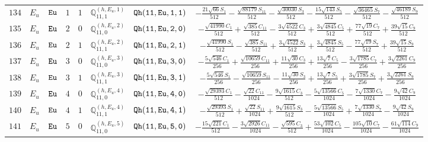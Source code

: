 \documentclass[fleqn,8pt]{jsarticle}
\begin{document}
\begin{table}[ht!]
\begin{center}
\begin{tabular}{cccccccc}
$ 134 $ & $ E_{u} $ & $ {\tt Eu} $ & $ 1 $ & $ 1 $ & $ \mathbb{Q}_{11,1}^{(h,E_{u},1)} $ & $ {\tt Qh(11,Eu,1,1)} $ & $ - \frac{21 \sqrt{66} S_{1}}{512} - \frac{\sqrt{88179} S_{11}}{512} - \frac{\sqrt{30030} S_{3}}{512} - \frac{15 \sqrt{143} S_{5}}{512} - \frac{\sqrt{36465} S_{7}}{512} - \frac{\sqrt{46189} S_{9}}{512} $ \\
$ 135 $ & $ E_{u} $ & $ {\tt Eu} $ & $ 2 $ & $ 0 $ & $ \mathbb{Q}_{11,0}^{(h,E_{u},2)} $ & $ {\tt Qh(11,Eu,2,0)} $ & $ - \frac{\sqrt{41990} C_{1}}{512} + \frac{\sqrt{385} C_{11}}{512} - \frac{3 \sqrt{4522} C_{3}}{512} + \frac{3 \sqrt{4845} C_{5}}{512} + \frac{77 \sqrt{19} C_{7}}{512} + \frac{39 \sqrt{15} C_{9}}{512} $ \\
$ 136 $ & $ E_{u} $ & $ {\tt Eu} $ & $ 2 $ & $ 1 $ & $ \mathbb{Q}_{11,1}^{(h,E_{u},2)} $ & $ {\tt Qh(11,Eu,2,1)} $ & $ - \frac{\sqrt{41990} S_{1}}{512} - \frac{\sqrt{385} S_{11}}{512} + \frac{3 \sqrt{4522} S_{3}}{512} + \frac{3 \sqrt{4845} S_{5}}{512} - \frac{77 \sqrt{19} S_{7}}{512} + \frac{39 \sqrt{15} S_{9}}{512} $ \\
$ 137 $ & $ E_{u} $ & $ {\tt Eu} $ & $ 3 $ & $ 0 $ & $ \mathbb{Q}_{11,0}^{(h,E_{u},3)} $ & $ {\tt Qh(11,Eu,3,0)} $ & $ - \frac{5 \sqrt{546} C_{1}}{256} + \frac{\sqrt{10659} C_{11}}{256} + \frac{11 \sqrt{30} C_{3}}{256} + \frac{13 \sqrt{7} C_{5}}{256} - \frac{3 \sqrt{1785} C_{7}}{256} + \frac{3 \sqrt{2261} C_{9}}{256} $ \\
$ 138 $ & $ E_{u} $ & $ {\tt Eu} $ & $ 3 $ & $ 1 $ & $ \mathbb{Q}_{11,1}^{(h,E_{u},3)} $ & $ {\tt Qh(11,Eu,3,1)} $ & $ - \frac{5 \sqrt{546} S_{1}}{256} - \frac{\sqrt{10659} S_{11}}{256} - \frac{11 \sqrt{30} S_{3}}{256} + \frac{13 \sqrt{7} S_{5}}{256} + \frac{3 \sqrt{1785} S_{7}}{256} + \frac{3 \sqrt{2261} S_{9}}{256} $ \\
$ 139 $ & $ E_{u} $ & $ {\tt Eu} $ & $ 4 $ & $ 0 $ & $ \mathbb{Q}_{11,0}^{(h,E_{u},4)} $ & $ {\tt Qh(11,Eu,4,0)} $ & $ - \frac{\sqrt{29393} C_{1}}{512} - \frac{\sqrt{22} C_{11}}{1024} - \frac{9 \sqrt{1615} C_{3}}{512} - \frac{5 \sqrt{13566} C_{5}}{1024} - \frac{7 \sqrt{1330} C_{7}}{1024} - \frac{9 \sqrt{42} C_{9}}{1024} $ \\
$ 140 $ & $ E_{u} $ & $ {\tt Eu} $ & $ 4 $ & $ 1 $ & $ \mathbb{Q}_{11,1}^{(h,E_{u},4)} $ & $ {\tt Qh(11,Eu,4,1)} $ & $ - \frac{\sqrt{29393} S_{1}}{512} + \frac{\sqrt{22} S_{11}}{1024} + \frac{9 \sqrt{1615} S_{3}}{512} - \frac{5 \sqrt{13566} S_{5}}{1024} + \frac{7 \sqrt{1330} S_{7}}{1024} - \frac{9 \sqrt{42} S_{9}}{1024} $ \\
$ 141 $ & $ E_{u} $ & $ {\tt Eu} $ & $ 5 $ & $ 0 $ & $ \mathbb{Q}_{11,0}^{(h,E_{u},5)} $ & $ {\tt Qh(11,Eu,5,0)} $ & $ - \frac{15 \sqrt{221} C_{1}}{512} - \frac{3 \sqrt{2926} C_{11}}{1024} - \frac{\sqrt{595} C_{3}}{512} + \frac{53 \sqrt{102} C_{5}}{1024} - \frac{105 \sqrt{10} C_{7}}{1024} - \frac{61 \sqrt{114} C_{9}}{1024} $ \\

\end{tabular}
\end{center}
\end{table}
\end{document}
